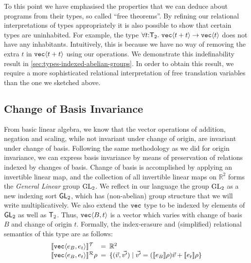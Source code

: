 \begin{example}\label{ex:uninhabited-type}
  To this point we have emphasised the properties that we can deduce
  about programs from their types, so called ``free theorems''. By
  refining our relational interpretations of types appropriately it is
  also possible to show that certain types are uninhabited. For
  example, the type $\forall t \mathord: \mathsf{T}_2.\
  \texttt{vec}\langle t + t \rangle \to \texttt{vec}\langle t \rangle$ does not have any
  inhabitants. Intuitively, this is because we have no way of removing
  the extra $t$ in $\texttt{vec}\langle t+t \rangle$ using our operations. We
  demonstrate this indefinability result in
  \autoref{sec:types-indexed-abelian-groups}. In order to obtain this
  result, we require a more sophisticated relational interpretation of
  free translation variables than the one we sketched above.
\end{example}

\subsection{Change of Basis Invariance}
\label{sec:motivation-generalising}

From basic linear algebra, we know that the vector operations of
addition, negation and scaling, while not invariant under change of
origin, are invariant under change of basis. Following the same
methodology as we did for origin invariance, we can express basis
invariance by means of preservation of relations indexed by changes of
basis. Change of basis is accomplished by applying an invertible
linear map, and the collection of all invertible linear maps on
$\mathbb{R}^2$ forms the \emph{General Linear} group $\mathrm{GL}_2$. We
reflect in our language the group $\mathrm{GL}_2$ as a new indexing sort
$\mathsf{GL}_2$, which has (non-abelian) group structure that we will
write multiplicatively. We also extend the $\texttt{vec}$ type to be
indexed by elements of $\mathsf{GL}_2$ as well as $\mathsf{T}_2$. Thus,
$\texttt{vec}\langle B,t \rangle$ is a vector which varies with change of basis $B$
and change of origin $t$. Formally, the index-erasure and (simplified)
relational semantics of this type are as follows:
\begin{displaymath}
  \begin{array}{l@{\hspace{0.5em}=\hspace{0.5em}}l}
    \tySem{\tyPrim{vec}{e_B,e_t}} & \mathbb{R}^2 \\
    \rsem{\tyPrim{vec}{e_B,e_t}}{}\rho & \{ (\vec{v},\vec{v'}) \sepbar \vec{v'} = (\sem{e_B}\rho)\vec{v} + \sem{e_t}\rho \}
  \end{array}
\end{displaymath}

